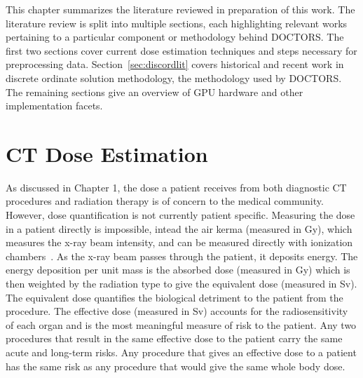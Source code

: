 
This chapter summarizes the literature reviewed in preparation of this work. The literature review is split into multiple sections, each highlighting relevant works pertaining to a particular component or methodology behind DOCTORS. The first two sections cover current dose estimation techniques and steps necessary for preprocessing data. Section~\ref{sec:discordlit} covers historical and recent work in discrete ordinate solution methodology, the methodology used by DOCTORS. The remaining sections give an overview of GPU hardware and other implementation facets.

\section{CT Dose Estimation}
As discussed in Chapter 1, the dose a patient receives from both diagnostic CT procedures and radiation therapy is of concern to the medical community. However, dose quantification is not currently patient specific. Measuring the dose in a patient directly is impossible, intead the air kerma (measured in Gy), which measures the x-ray beam intensity, and can be measured directly with ionization chambers~\citep{ef:wolbarsta}. As the x-ray beam passes through the patient, it deposits energy. The energy deposition per unit mass is the absorbed dose (measured in Gy) which is then weighted by the radiation type to give the equivalent dose (measured in Sv). The equivalent dose quantifies the biological detriment to the patient from the procedure. The effective dose (measured in Sv) accounts for the radiosensitivity of each organ and is the most meaningful measure of risk to the patient. Any two procedures that result in the same effective dose to the patient carry the same acute and long-term risks. Any procedure that gives an effective dose to a patient has the same risk as any procedure that would give the same whole body dose.

